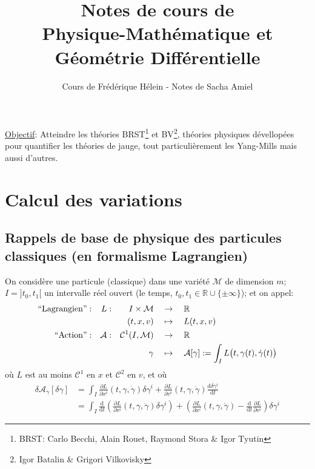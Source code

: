\documentclass[a4paper,11pt]{article}
\renewcommand{\d}{{\mathrm{d}}}
\newcommand{\dr}[2]{\frac{\partial {#1}}{\partial{#2}}}
\begin{document}
\title{Notes de cours de\\Physique-Mathématique et Géométrie Différentielle}
\author{Cours de Frédérique Hélein - Notes de Sacha Amiel}
\maketitle
\tableofcontents
\newpage
\noindent\underline{Objectif}: Atteindre les théories BRST\footnote{BRST: Carlo Becchi, Alain Rouet, Raymond Stora \& Igor Tyutin} et BV\footnote{Igor Batalin \& Grigori Vilkovisky}, théories physiques dévellopées pour quantifier les théories de jauge, tout particulièrement les Yang-Mills mais aussi d'autres.

\section{Calcul des variations}
\subsection{Rappels de base de physique des particules classiques (en formalisme Lagrangien)}
\quad On considère une particule (classique) dans une variété $\mathcal{M}$ de dimension $m$; $I=]t_0,t_1[$ un intervalle réel ouvert (le temps, $t_0, t_1 \in \mathbb{R}\cup \{\pm \infty\}$); et on appel:
\begin{align*}
	``\mathrm{Lagrangien}":
		&&L: &&I\times\mathcal{M} \quad&\to\quad \mathbb{R}\\
		&&&& (t,x,v) \quad&\mapsto\quad L(t,x,v)\notag\\
	``\mathrm{Action}":
		&&\mathcal{A}: &&\mathcal{C}^1(I,\mathcal{M}) \quad &\to \quad	\mathbb{R}\\
		&&&&\gamma \quad&\mapsto\quad\mathcal{A}[\gamma]:=\int_I L\big(t,\gamma(t),\dot \gamma(t)\big)\notag
\end{align*}
où $L$ est au moins $\mathcal{C}^1$ en $x$ et $\mathcal{C}^2$ en $v$, et où
\begin{equation*}\begin{split}
\delta\mathcal{A}_\gamma[\delta\gamma]
&=\int_I \dr{L}{x^i}(t,\gamma,\dot \gamma)\delta\gamma^i + \dr{L}{v^i}(t,\gamma, \dot \gamma)\frac{\d \delta \gamma^i}{\d t}\\
&=\int_I \frac{\d}{\d t}\left(\dr{L}{v^i}(t,\gamma,\dot \gamma)\delta\gamma^i \right)+ \left(\dr{L}{x^i}(t,\gamma, \dot \gamma) - \frac{\d}{\d t}\dr{L}{v^i}\right)\delta \gamma^i
\end{split}\end{equation*}
\end{document}
